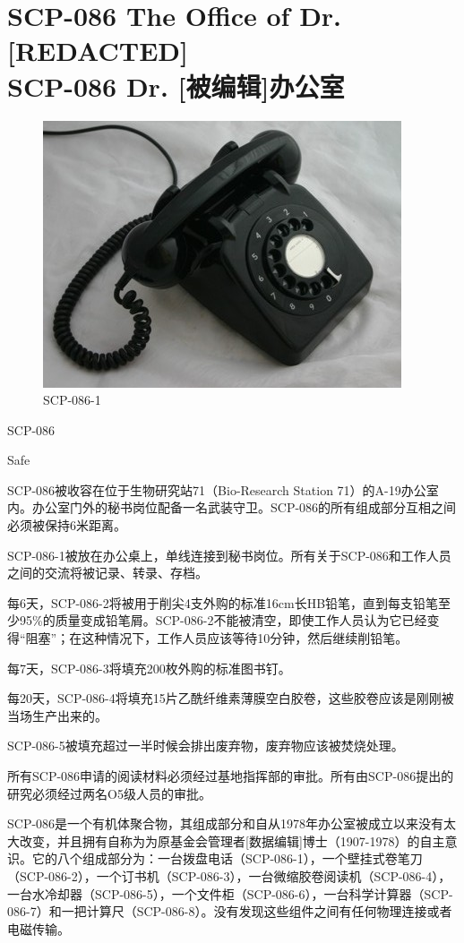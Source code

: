 \chapter[SCP-086 Dr. {[}被编辑{]}办公室]{
    SCP-086 The Office of Dr. [REDACTED]\\
    SCP-086 Dr. [被编辑]办公室
}

\label{chap:SCP-086}

\begin{figure}[H]
    \centering
    \includegraphics[width=0.5\linewidth]{images/SCP.086.jpg}
    \caption*{SCP-086-1}
\end{figure}

SCP-086

  Safe

SCP-086被收容在位于生物研究站71（Bio-Research Station 71）的A-19办公室内。办公室门外的秘书岗位配备一名武装守卫。SCP-086的所有组成部分互相之间必须被保持6米距离。

SCP-086-1被放在办公桌上，单线连接到秘书岗位。所有关于SCP-086和工作人员之间的交流将被记录、转录、存档。

每6天，SCP-086-2将被用于削尖4支外购的标准16cm长HB铅笔，直到每支铅笔至少95\%的质量变成铅笔屑。SCP-086-2不能被清空，即使工作人员认为它已经变得“阻塞”；在这种情况下，工作人员应该等待10分钟，然后继续削铅笔。

每7天，SCP-086-3将填充200枚外购的标准图书钉。

每20天，SCP-086-4将填充15片乙酰纤维素薄膜空白胶卷，这些胶卷应该是刚刚被当场生产出来的。

SCP-086-5被填充超过一半时候会排出废弃物，废弃物应该被焚烧处理。

所有SCP-086申请的阅读材料必须经过基地指挥部的审批。所有由SCP-086提出的研究必须经过两名O5级人员的审批。

SCP-086是一个有机体聚合物，其组成部分和自从1978年办公室被成立以来没有太大改变，并且拥有自称为为原基金会管理者{[}数据编辑]博士（1907-1978）的自主意识。它的八个组成部分为：一台拨盘电话（SCP-086-1），一个壁挂式卷笔刀（SCP-086-2），一个订书机（SCP-086-3），一台微缩胶卷阅读机（SCP-086-4），一台水冷却器（SCP-086-5），一个文件柜（SCP-086-6），一台科学计算器（SCP-086-7）和一把计算尺（SCP-086-8）。没有发现这些组件之间有任何物理连接或者电磁传输。

